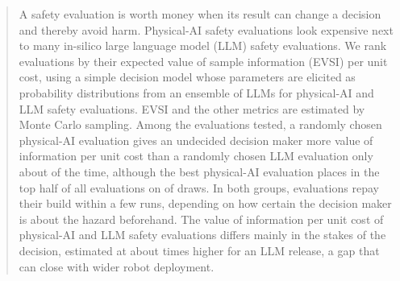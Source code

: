 \begin{abstract}
A safety evaluation is worth money when its result can change a decision and thereby avoid harm.
Physical-AI safety evaluations look expensive next to many in-silico large language model (LLM) safety evaluations.
We rank evaluations by their expected value of sample information (EVSI) per unit cost, using a simple decision model whose parameters are elicited as probability distributions from an ensemble of \voiNMembers{} LLMs for \voiNPhysical{} physical-AI and \voiNLLM{} LLM safety evaluations. EVSI and the other metrics are estimated by Monte Carlo sampling.
Among the evaluations tested, a randomly chosen physical-AI evaluation gives an undecided decision maker more value of information per unit cost than a randomly chosen LLM evaluation only about \voiEtaStarPSQMed{} of the time, although the best physical-AI evaluation places in the top half of all evaluations on \voiEtaStarPBestPhysicalTopHalf{} of draws. %
In both groups, evaluations repay their build within a few runs, depending on how certain the decision maker is about the hazard beforehand. %
The value of information per unit cost of physical-AI and LLM safety evaluations differs mainly in the stakes of the decision, estimated at about \voiStakesRatio{} times higher for an LLM release, a gap that can close with wider robot deployment. %
\end{abstract}
